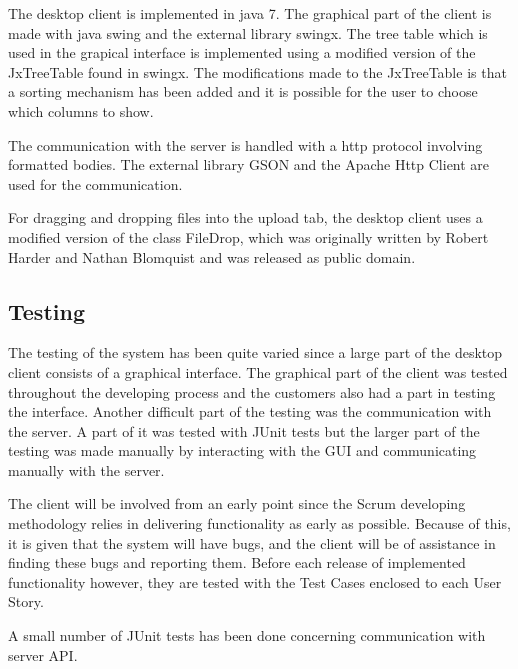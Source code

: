 The desktop client is implemented in java 7. The graphical part of the client is made with java swing and the external library swingx. The tree table which is used in the grapical interface is implemented using a modified version of the JxTreeTable found in swingx. The modifications made to the JxTreeTable is that a sorting mechanism has been added and it is possible for the user to choose which columns to show.

The communication with the server is handled with a http protocol involving \json formatted bodies. The external library GSON and the Apache Http Client are used for the communication.

For dragging and dropping files into the upload tab, the desktop client uses a modified version of the class FileDrop, which was originally written by Robert Harder and Nathan Blomquist and was released as public domain.

\subsection{Testing}

The testing of the system has been quite varied since a large part of the desktop client consists of a graphical interface. The graphical part of the client was tested throughout the developing process and the customers also had a part in testing the interface. Another difficult part of the testing was the communication with the server. A part of it was tested with JUnit tests but the larger part of the testing was made manually by interacting with the GUI and communicating manually with the server.

The client will be involved from an early point since the Scrum developing methodology relies in delivering functionality as early as possible. Because of this, it is given that the system will have bugs, and the client will be of assistance in finding these bugs and reporting them. Before each release of implemented functionality however, they are tested with the Test Cases enclosed to each User Story.

A small number of JUnit tests has been done concerning communication with server API.

\FloatBarrier
